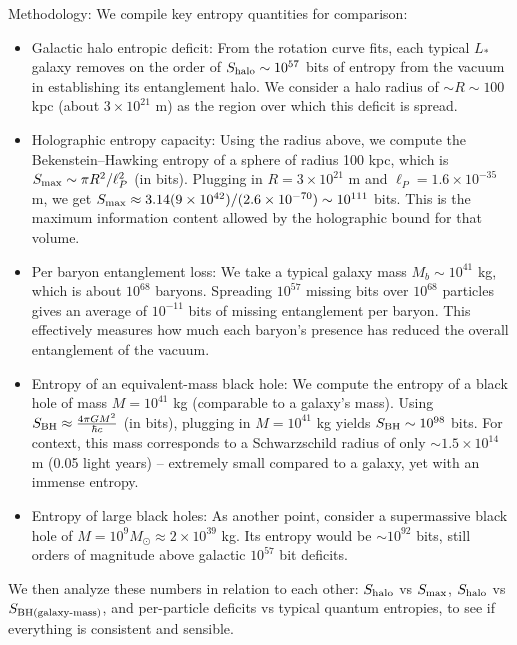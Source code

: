 \documentclass[11pt]{article}
\begin{document}
Methodology: We compile key entropy quantities for comparison:
\begin{itemize}
    \item Galactic halo entropic deficit: From the rotation curve fits, each typical $L_*$ galaxy removes on the order of $S_{\rm halo}\sim 10^{57}$ bits of entropy from the vacuum in establishing its entanglement halo. We consider a halo radius of $\sim R \sim 100$ kpc (about $3\times10^{21}$ m) as the region over which this deficit is spread.
    \item Holographic entropy capacity: Using the radius above, we compute the Bekenstein–Hawking entropy of a sphere of radius 100 kpc, which is $S_{\rm max} \sim \pi R^2/\ell_P^2$ (in bits). Plugging in $R = 3\times10^{21}$ m and $\ell_P = 1.6\times10^{-35}$ m, we get $S_{\rm max} \approx 3.14 (9\times10^{42})/(2.6\times10^{-70}) \sim 10^{111}$ bits. This is the maximum information content allowed by the holographic bound for that volume.
    \item Per baryon entanglement loss: We take a typical galaxy mass $M_b \sim 10^{41}$ kg, which is about $10^{68}$ baryons. Spreading $10^{57}$ missing bits over $10^{68}$ particles gives an average of $10^{-11}$ bits of missing entanglement per baryon​. This effectively measures how much each baryon’s presence has reduced the overall entanglement of the vacuum.
    \item Entropy of an equivalent-mass black hole: We compute the entropy of a black hole of mass $M = 10^{41}$ kg (comparable to a galaxy’s mass). Using $S_{\rm BH}\approx\frac{4\pi G M^2}{\hbar c}$ (in bits), plugging in $M=10^{41}$ kg yields $S_{\rm BH}\sim 10^{98}$ bits. For context, this mass corresponds to a Schwarzschild radius of only $\sim 1.5\times10^{14}$ m (0.05 light years) – extremely small compared to a galaxy, yet with an immense entropy.
    \item Entropy of large black holes: As another point, consider a supermassive black hole of $M = 10^9 M_\odot \approx 2\times10^{39}$ kg. Its entropy would be $\sim 10^{92}$ bits, still orders of magnitude above galactic $10^{57}$ bit deficits.
\end{itemize}
We then analyze these numbers in relation to each other: $S_{\rm halo}$ vs $S_{\rm max}$, $S_{\rm halo}$ vs $S_{\rm BH(\text{galaxy-mass})}$, and per-particle deficits vs typical quantum entropies, to see if everything is consistent and sensible.
\end{document}
